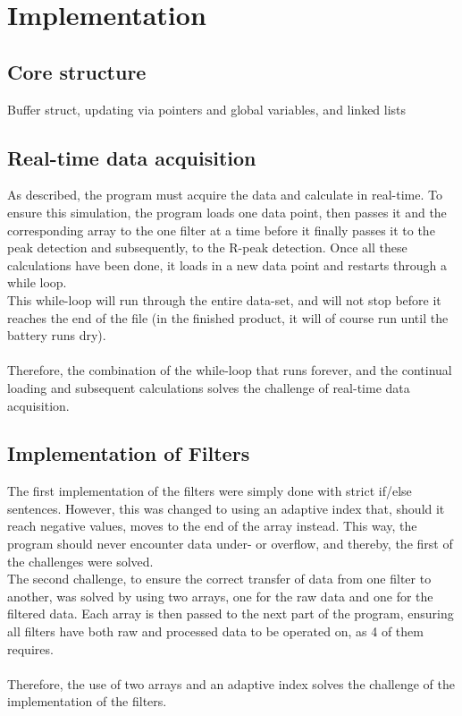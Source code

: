 \documentclass[12pt,a4paper]{article}
\begin{document}
\section{Implementation}
\subsection{Core structure}
Buffer struct, updating via pointers and global variables, and linked lists

\subsection{Real-time data acquisition}
	As described, the program must acquire the data and calculate in real-time. To ensure this simulation, the program loads one data point, then passes it and the corresponding array to the one filter at a time before it finally passes it to the peak detection and subsequently, to the R-peak detection. Once all these calculations have been done, it loads in a new data point and restarts through a while loop.\\
	This while-loop will run through the entire data-set, and will not stop before it reaches the end of the file (in the finished product, it will of course run until the battery runs dry).\\
	\\
	Therefore, the combination of the while-loop that runs forever, and the continual loading and subsequent calculations solves the challenge of real-time data acquisition.\\

\subsection{Implementation of Filters}
	The first implementation of the filters were simply done with strict if/else sentences. However, this was changed to using an adaptive index that, should it reach negative values, moves to the end of the array instead. This way, the program should never encounter data under- or overflow, and thereby, the first of the challenges were solved.\\
	The second challenge, to ensure the correct transfer of data from one filter to another, was solved by using two arrays, one for the raw data and one for the filtered data. Each array is then passed to the next part of the program, ensuring all filters have both raw and processed data to be operated on, as 4 of them requires.\\
	\\
	Therefore, the use of two arrays and an adaptive index solves the challenge of the implementation of the filters.\\
	
\end{document}
